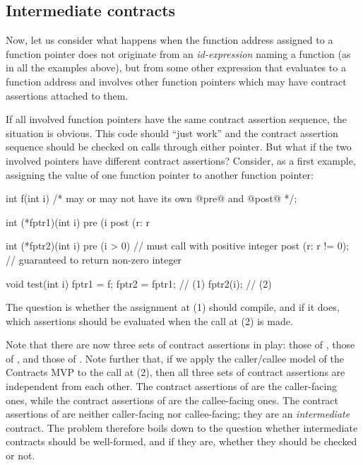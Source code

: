 
\subsection{Intermediate contracts}
\label{intermediate}

Now, let us consider what happens when the function address assigned to a function pointer does not originate from an \emph{id-expression} naming a function (as in all the examples above), but from some other expression that evaluates to a function address and involves other function pointers which may have contract assertions attached to them. 

If all involved function pointers have the same contract assertion sequence, the situation is obvious. This code should ``just work'' and the contract assertion sequence should be checked on calls through either pointer. But what if the two involved pointers have different contract assertions? Consider, as a first example, assigning the value of one function pointer to another function pointer:
\begin{codeblock}
int f(int i) /* may or may not have its own @pre@ and @post@ */;

int (*fptr1)(int i)
  pre (i %
  post (r: r %

int (*fptr2)(int i)
  pre (i > 0)           // must call with positive integer
  post (r: r != 0);     // guaranteed to return non-zero integer

void test(int i) {
  fptr1 = f;
  fptr2 = fptr1;  // (1)
  fptr2(i);       // (2)
}
\end{codeblock}
The question is whether the assignment at (1) should compile, and if it does, which assertions should be evaluated when the call at (2) is made.

Note that there are now three sets of contract assertions in play: those of , those of , and those of . Note further that, if we apply the caller/callee model of the Contracts MVP to the call at (2), then all three sets of contract assertions are independent from each other. The contract assertions of  are the caller-facing ones, while the contract assertions of  are the callee-facing ones. The contract assertions of  are neither caller-facing nor callee-facing; they are an \emph{intermediate} contract. The problem therefore boils down to the question whether intermediate contracts should be well-formed, and if they are, whether they should be checked or not.

